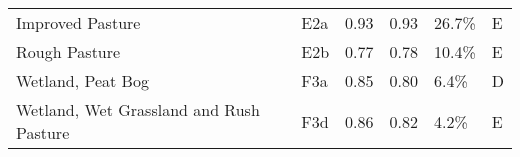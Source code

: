 \begin{tabular}{llllll}
                          Improved Pasture &           E2a &                 0.93 &               0.93 &                    26.7\% &                   E \\
                             Rough Pasture &           E2b &                 0.77 &               0.78 &                    10.4\% &                   E \\
                         Wetland, Peat Bog &           F3a &                 0.85 &               0.80 &                     6.4\% &                   D \\
   Wetland, Wet Grassland and Rush Pasture &           F3d &                 0.86 &               0.82 &                     4.2\% &                   E \\
\bottomrule
\end{tabular}
